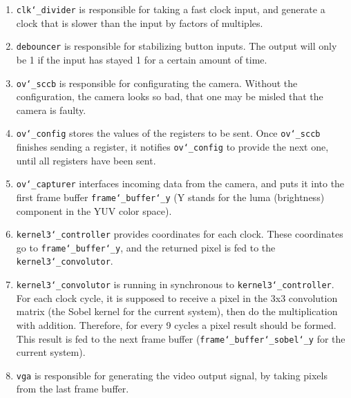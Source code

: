 \documentclass{IEEEtran}
\begin{document}
	\begin{enumerate}
		\item \texttt{clk\char`_divider} is responsible for taking a fast clock input, and generate a clock that is slower than the input by factors of multiples.
		\item \texttt{debouncer} is responsible for stabilizing button inputs. The output will only be 1 if the input has stayed 1 for a certain amount of time.
		\item \texttt{ov\char`_sccb} is responsible for configurating the camera. Without the configuration, the camera looks so bad, that one may be misled that the camera is faulty.
		\item \texttt{ov\char`_config} stores the values of the registers to be sent. Once \texttt{ov\char`_sccb} finishes sending a register, it notifies \texttt{ov\char`_config} to provide the next one, until all registers have been sent.
		\item \texttt{ov\char`_capturer} interfaces incoming data from the camera, and puts it into the first frame buffer \texttt{frame\char`_buffer\char`_y} (Y stands for the luma (brightness) component in the YUV color space).
		\item \texttt{kernel3\char`_controller} provides coordinates for each clock. These coordinates go to \texttt{frame\char`_buffer\char`_y}, and the returned pixel is fed to the \texttt{kernel3\char`_convolutor}.
		\item \texttt{kernel3\char`_convolutor} is running in synchronous to \texttt{kernel3\char`_controller}. For each clock cycle, it is supposed to receive a pixel in the 3x3 convolution matrix (the Sobel kernel for the current system), then do the multiplication with addition. Therefore, for every 9 cycles a pixel result should be formed. This result is fed to the next frame buffer (\texttt{frame\char`_buffer\char`_sobel\char`_y} for the current system).
		\item \texttt{vga} is responsible for generating the video output signal, by taking pixels from the last frame buffer.
	\end{enumerate}
\end{document}

